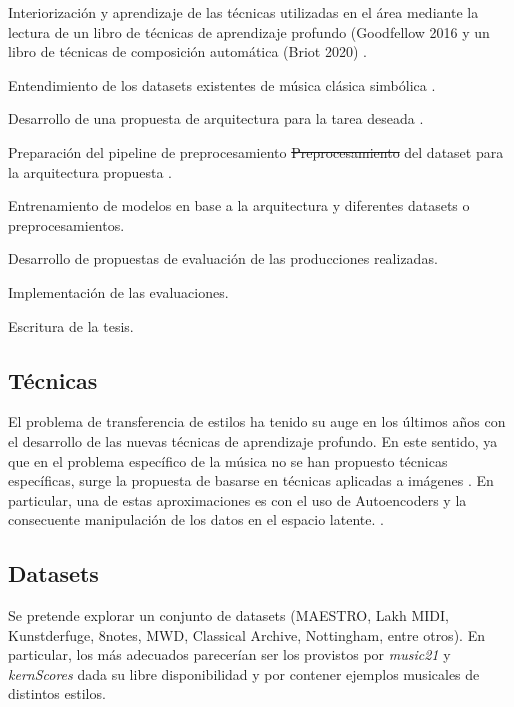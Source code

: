 \documentclass[10pt]{article}
\newcommand{\suggestM}[2]{{\color{orange} #1}{ \color{red}\sout{#2}}}
\begin{document}
\begin{itemize}
\item Interiorización y aprendizaje de las técnicas utilizadas en el área \suggestM{mediante la lectura de un libro de técnicas de aprendizaje profundo (Goodfellow 2016 \cite{goodfellow2016deep} y un libro de técnicas de composición automática (Briot 2020) \cite{briot2020depp}}{}\cite{briot2020deep, goodfellow2016deep}.
    \item Entendimiento de los datasets existentes de música clásica simbólica  \cite{Cuthbert2010Music21AT}.
    \item Desarrollo de una propuesta de arquitectura para la tarea deseada \suggestM{}{}\cite{guo2020variational, roberts2019musicvae}.
    \item \suggestM{Preparación del pipeline de preprocesamiento}{Preprocesamiento} del dataset para la arquitectura propuesta \suggestM{\cite{Cuthbert2010Music21AT}}{}.
    \item Entrenamiento de modelos en base a la arquitectura y diferentes datasets o preprocesamientos.
    \item Desarrollo de propuestas de evaluación de las producciones realizadas.
    \item Implementación de las evaluaciones.
      \suggestM{\item Escritura de la tesis.}{}
\end{itemize}

\subsection*{Técnicas}
El problema de transferencia de estilos ha tenido su auge en los últimos años con el desarrollo de las nuevas técnicas de aprendizaje profundo. En este sentido, ya que en el problema específico de la música no se han propuesto técnicas específicas, surge la propuesta de basarse en técnicas aplicadas a imágenes \cite{briot2020deep}. En particular, una de estas aproximaciones es con el uso de Autoencoders \cite{goodfellow2016deep} y la consecuente manipulación de los datos en el espacio latente.
.

\subsection*{Datasets}
Se pretende explorar un conjunto de datasets (MAESTRO, Lakh MIDI, Kunstderfuge, 8notes, MWD, Classical Archive, Nottingham, entre otros). En particular, los más adecuados parecerían ser los provistos por \textit{music21} y \textit{kernScores} dada su libre disponibilidad y por contener ejemplos musicales de distintos estilos.
\end{document}
